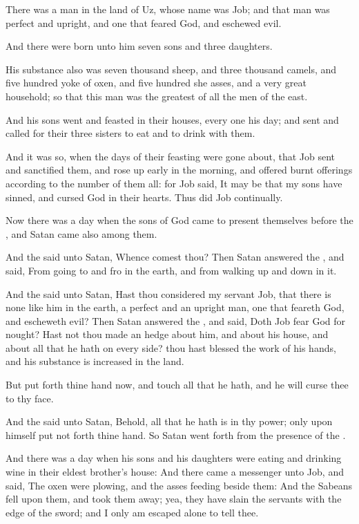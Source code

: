 \Chapter
\Verse There was a man in the land of Uz, whose name was Job; and that man was perfect and upright, and one that feared God, and eschewed evil.

\Verse And there were born unto him seven sons and three daughters.

\Verse His substance also was seven thousand sheep, and three thousand camels, and five hundred yoke of oxen, and five hundred she asses, and a very great household; so that this man was the greatest of all the men of the east.

\Verse And his sons went and feasted in their houses, every one his day; and sent and called for their three sisters to eat and to drink with them.

\Verse And it was so, when the days of their feasting were gone about, that Job sent and sanctified them, and rose up early in the morning, and offered burnt offerings according to the number of them all: for Job said, It may be that my sons have sinned, and cursed God in their hearts. Thus did Job continually.

\Verse Now there was a day when the sons of God came to present themselves before the \LORD, and Satan came also among them.

\Verse And the \LORD said unto Satan, Whence comest thou? Then Satan answered the \LORD, and said, From going to and fro in the earth, and from walking up and down in it.

\Verse And the \LORD said unto Satan, Hast thou considered my servant Job, that there is none like him in the earth, a perfect and an upright man, one that feareth God, and escheweth evil?  \Verse Then Satan answered the \LORD, and said, Doth Job fear God for nought?  \Verse Hast not thou made an hedge about him, and about his house, and about all that he hath on every side? thou hast blessed the work of his hands, and his substance is increased in the land.

\Verse But put forth thine hand now, and touch all that he hath, and he will curse thee to thy face.

\Verse And the \LORD said unto Satan, Behold, all that he hath is in thy power; only upon himself put not forth thine hand. So Satan went forth from the presence of the \LORD.

\Verse And there was a day when his sons and his daughters were eating and drinking wine in their eldest brother's house: \Verse And there came a messenger unto Job, and said, The oxen were plowing, and the asses feeding beside them: \Verse And the Sabeans fell upon them, and took them away; yea, they have slain the servants with the edge of the sword; and I only am escaped alone to tell thee.

